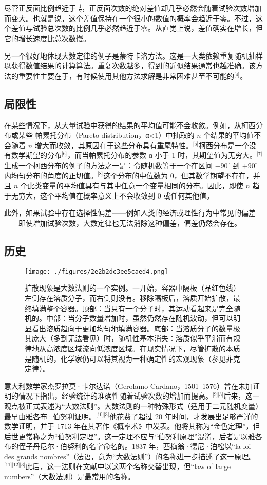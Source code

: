 尽管正反面比例趋近于 $\frac{1}{2}$，正反面次数的绝对差值却几乎必然会随着试验次数增加而变大。也就是说，这个差值保持在一个很小的数值的概率会趋近于零。不过，这个差值与试验总次数的比例几乎必然趋近于零。从直觉上说，差值确实在增长，但它的增长速度比总次数慢。

另一个很好地体现大数定律的例子是蒙特卡洛方法。这是一大类依赖重复随机抽样以获得数值结果的计算算法。重复次数越多，得到的近似结果通常也越准确。该方法的重要性主要在于，有时候使用其他方法求解是非常困难甚至不可能的\(^\text{[4]}\)。
\subsection{局限性}
在某些情况下，从大量试验中获得的结果的平均值可能不会收敛。例如，从柯西分布或某些 帕累托分布（Pareto distribution，α<1）中抽取的 $n$ 个结果的平均值不会随着 $n$ 增大而收敛，其原因在于这些分布具有重尾特性。\(^\text{[5]}\)柯西分布是一个没有数学期望的分布\(^\text{[6]}\)，而当帕累托分布的参数 α 小于 1 时，其期望值为无穷大。\(^\text{[7]}\)生成一个柯西分布的例子的方法之一是：令随机数等于一个在区间 $-90^\circ$ 到 $+90^\circ$ 内均匀分布的角度的正切值。\(^\text{[8]}\)这个分布的中位数为 0，但其数学期望不存在，并且 $n$ 个此类变量的平均值具有与其中任意一个变量相同的分布。因此，即使 $n$ 趋于无穷大，这个平均值在概率意义上不会收敛到 0 或任何其他值。

此外，如果试验中存在选择性偏差——例如人类的经济或理性行为中常见的偏差——即使增加试验次数，大数定律也无法消除这种偏差，偏差仍然会存在。
\subsection{历史}
\begin{figure}[ht]
\centering
\texttt{[image: ./figures/2e2b2dc3ee5caed4.png]}
\caption{扩散现象是大数法则的一个实例。一开始，容器中隔板（品红色线）左侧存在溶质分子，而右侧则没有。移除隔板后，溶质开始扩散，最终填满整个容器。顶部：当只有一个分子时，其运动看起来是完全随机的。中部：当分子数量增加时，虽然仍然存在随机波动，但可以明显看出溶质趋向于更加均匀地填满容器。底部：当溶质分子的数量极其庞大（多到无法看见）时，随机性基本消失：溶质似乎平滑而有规律地从高浓度区域流向低浓度区域。在现实情况下，尽管扩散的本质是随机的，化学家仍可以将其视为一种确定性的宏观现象（参见菲克定律）。} \label{fig_DSdl_3}
\end{figure}
意大利数学家杰罗拉莫·卡尔达诺（Gerolamo Cardano，1501–1576）曾在未加证明的情况下指出，经验统计的准确性随着试验次数的增加而提高。\(^\text{[9][3]}\)后来，这一观点被正式表述为“大数法则”。大数法则的一种特殊形式（适用于二元随机变量）最早由雅各布·伯努利证明。\(^\text{[10][3]}\)他花费了超过 20 年时间，才发展出足够严谨的数学证明，并于 1713 年在其著作《概率术》中发表。他将其称为“金色定理”，但后世更常称之为“伯努利定理”。这一定理不应与“伯努利原理”混淆，后者是以雅各布的侄子丹尼尔·伯努利的名字命名的。1837 年，西梅翁·德尼·泊松以“la loi des grands nombres”（法语，意为“大数法则”）的名称进一步描述了这一原理。\(^\text{[11][12][3]}\)此后，这一法则在文献中以这两个名称交替出现，但“law of large numbers”（大数法则）是最常用的名称。

